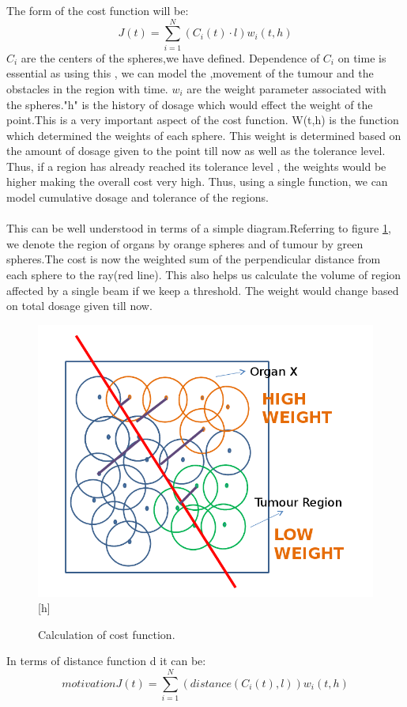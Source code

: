 \documentclass[10pt]{report}
\begin{document}
The form of the cost function will be:
\begin{equation}
J(t)=\sum_{i=1}^{N} (C_i(t) \cdot l )w_i(t,h)
\end{equation}
${C_i}$ are the centers of the spheres,we have defined. Dependence of ${C_i}$  on time is essential as using this , we can model the ,movement of the tumour and the obstacles in the region with time.
${w_i}$ are the weight parameter associated with the spheres."h" is the history of dosage which would effect the weight of the point.This is a very important aspect of the cost function. W(t,h) is the function which determined the weights of each sphere. This weight is determined based on the amount of dosage given to the point till now as well as the tolerance level. Thus, if a region has already reached its tolerance level , the weights would be higher making the overall cost very high. Thus, using a single function, we can model cumulative dosage and tolerance of the regions.
\\
\\
This can be well understood in terms of a simple diagram.Referring to figure \ref{fig_cost}, we denote the region of organs by orange spheres and of tumour by green spheres.The cost is now the weighted sum of the perpendicular distance from each sphere to the ray(red line). This also helps us calculate the volume of region affected by a single beam if we keep a threshold. The weight would change based on total dosage given till now. 
\begin{figure}
\includegraphics[scale=0.4]{resources/images/cost.png}[h]
\caption{Calculation of cost function.}
\label{fig_cost}
\end{figure}
In terms of distance function d it can be:
\begin{equation}motivation
J(t)=\sum_{i=1}^{N} (distance(C_i(t),l))w_i(t,h)
\end{equation}
\end{document}
